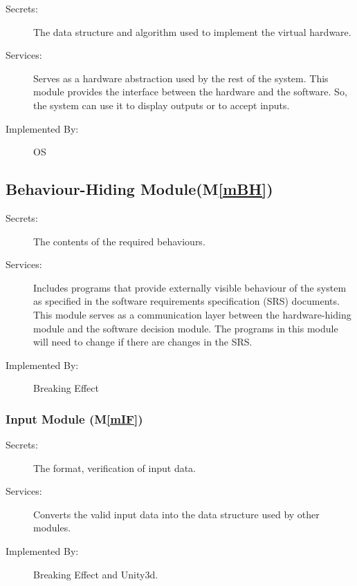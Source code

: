 \documentclass[12pt, titlepage]{article}
\newcommand{\mref}[1]{M\ref{#1}}
\begin{document}
	\begin{description}
		\item[Secrets:]The data structure and algorithm used to implement the virtual
		hardware.
		\item[Services:]Serves as a hardware abstraction used by the rest of the
		system. This module provides the interface between the hardware and the
		software. So, the system can use it to display outputs or to accept inputs.
		\item[Implemented By:] OS
	\end{description}
	
	\subsection{Behaviour-Hiding Module(\mref{mBH})}
	
	\begin{description}
		\item[Secrets:]The contents of the required behaviours.
		\item[Services:]Includes programs that provide externally visible behaviour of
		the system as specified in the software requirements specification (SRS)
		documents. This module serves as a communication layer between the
		hardware-hiding module and the software decision module. The programs in this
		module will need to change if there are changes in the SRS.
		\item[Implemented By:] Breaking Effect
	\end{description}
	
	\subsubsection{Input Module (\mref{mIF})}
	
	\begin{description}
		\item[Secrets:]The format, verification of input data.
		\item[Services:]Converts the valid input data into the data structure used by other modules. \\
		\item[Implemented By:] Breaking Effect and Unity3d. 
	\end{description}
	
\end{document}
